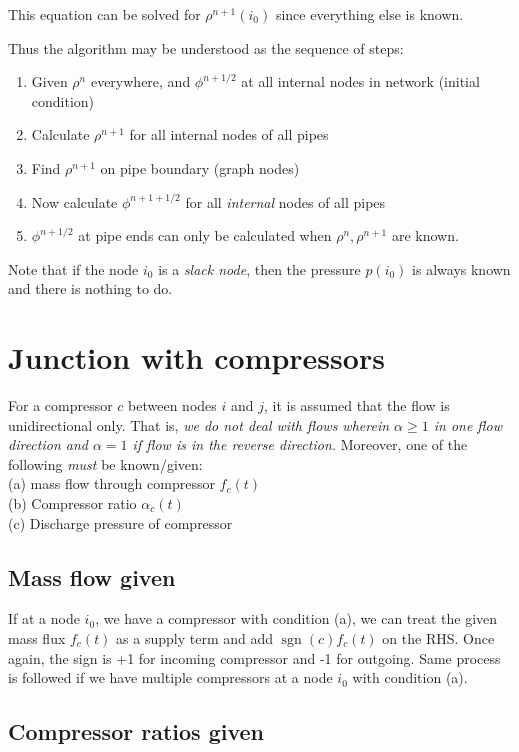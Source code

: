 \documentclass{amsart}
\DeclareMathOperator{\sgn}{sgn}
\begin{document}
This equation can be solved for $\rho^{n+1}(i_0)$ since everything else is known.

Thus the algorithm may be understood as the sequence of steps:
\begin{enumerate}
\item Given $\rho^n$ everywhere, and $\phi^{n+1/2}$ at all internal nodes in network (initial condition)	
 \item Calculate $\rho^{n+1}$ for all internal nodes of all pipes 
 \item Find $\rho^{n+1}$ on pipe boundary (graph nodes)
 \item Now calculate $\phi^{n+1 + 1/2}$ for all \emph{internal} nodes of all pipes
 \item $\phi^{n+1/2}$ at pipe ends can only be calculated when $\rho^n, \rho^{n+1}$ are known.
 \end{enumerate} 
Note that if the node $i_0$ is a \emph{slack node}, then the pressure $p(i_0)$ is always known and there is nothing to do.


\section{Junction with compressors}
For a compressor $c$ between nodes $i$ and $j$, it is assumed that the flow is unidirectional only. That is, \emph{we do not deal with flows wherein $\alpha \geq 1$ in one flow direction and $\alpha=1$  if  flow is in the reverse direction.} 
Moreover, one of the following \emph{must} be known/given: \\
(a) mass flow through compressor $f_c(t)$ \\
(b) Compressor ratio $\alpha_c(t)$ \\
(c) Discharge pressure of compressor \\ 

\subsection{Mass flow given}

If at a node $i_0$, we have a compressor with condition (a), we can treat the given mass flux $f_c(t)$ as a supply term and add $\sgn(c)f_c(t)$ on the RHS. Once again, the sign is +1 for incoming compressor and -1 for outgoing.
Same process is followed if we have multiple compressors at a node $i_0$ with condition (a).

\subsection{Compressor ratios given}
\end{document}
